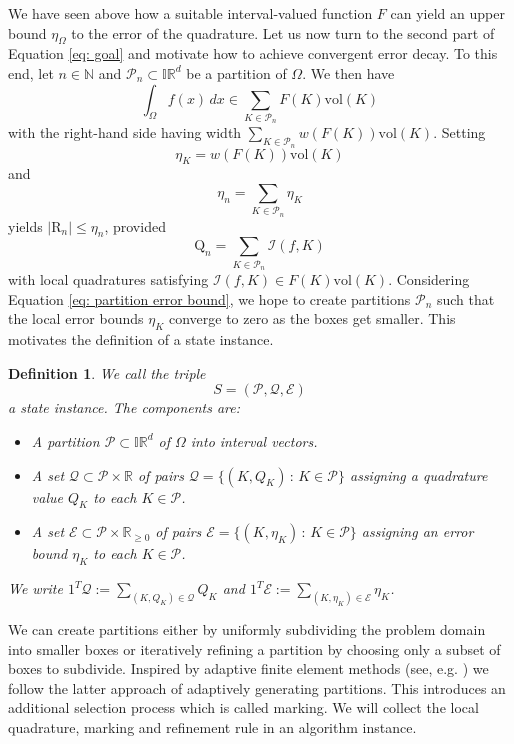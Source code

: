 \documentclass[a4paper, 11pt]{article}
\newtheorem{definition}[theorem]{Definition}
\newcommand{\vol}{\mathrm{vol}}
\begin{document}
	We have seen above how a suitable interval-valued function $F$ can yield an upper bound $\eta_\Omega$ to the error of the quadrature. Let us now turn to the second part of Equation \eqref{eq: goal} and motivate how to achieve convergent error decay. To this end, let $n \in \mathbb{N}$ and $\mathcal{P}_n\subset \mathbb{IR}^d $ be a partition of $\Omega$. We then have
	$$ \int_\Omega f(x) \, dx \in \sum_{K \in \mathcal{P}_n} F(K) \vol(K)  $$
	with the {right-hand side} having width $\sum_{K \in \mathcal{P}_n} w(F(K))\vol(K)$. Setting 
	\begin{equation}
		\eta_K = w(F(K))\vol(K)
	\end{equation}
	and
	\begin{equation}\label{eq: partition error bound}
		\eta_n =  \sum_{K \in \mathcal{P}_n} \eta_K
	\end{equation}
	yields $|\mathrm{R}_n| \leq \eta_n$, provided
	$$ \mathrm{Q}_n = \sum_{K \in \mathcal{P}_n} \mathcal{I}(f,K) $$
	with local quadratures satisfying $\mathcal{I}(f,K) \in F(K)\vol(K)$. Considering Equation \eqref{eq: partition error bound}, we hope to create partitions $\mathcal{P}_n$ such that the local error bounds $\eta_K$ converge to zero as the boxes get smaller. This motivates the definition of a state instance.
	
	\begin{definition}
		We call the triple
		\begin{equation}
			S = (\mathcal{P}, \mathcal{Q}, \mathcal{E})
		\end{equation}
		a state instance. The components are:
		\begin{itemize}
			\item A partition $\mathcal{P} \subset \mathbb{IR}^d$ of $\Omega$ into interval vectors.
			\item A set $\mathcal{Q} \subset \mathcal{P}\times \mathbb{R}$ of pairs $\mathcal{Q}=\{(K,Q_K)\,:\,K\in\mathcal{P}\}$ assigning a quadrature value $Q_K$ to each $K\in\mathcal{P}$.
			\item A set $\mathcal{E} \subset \mathcal{P}\times \mathbb{R}_{\geq 0}$ of pairs $\mathcal{E}=\{(K,\eta_K)\,:\,K\in\mathcal{P}\}$ assigning an error bound $\eta_K$ to each $K\in\mathcal{P}$.
		\end{itemize}
		We write $1^T\mathcal{Q} := \sum_{(K,Q_K)\in \mathcal{Q}} Q_K$ and $1^T\mathcal{E} := \sum_{(K,\eta_K)\in \mathcal{E}} \eta_K$.
	\end{definition}
	
	We can create partitions either by uniformly subdividing the problem domain into smaller boxes or iteratively refining a partition by choosing only a subset of boxes to subdivide. Inspired by adaptive finite element methods (see, e.g. \cite{verfurth2013posteriori}) we follow the latter approach of adaptively generating partitions. This introduces an additional selection process which is called marking. We will collect the local quadrature, marking and refinement rule in an algorithm instance.
	
\end{document}
